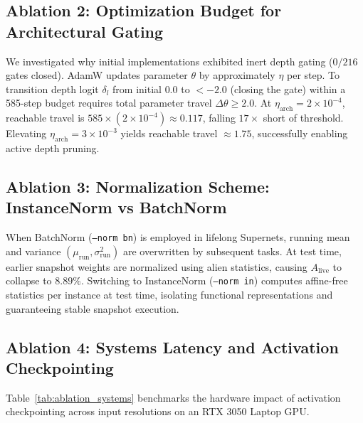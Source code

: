 \documentclass[11pt, a4paper]{article}
\begin{document}
\subsection{Ablation 2: Optimization Budget for Architectural Gating}

We investigated why initial implementations exhibited inert depth gating ($0/216$ gates closed). AdamW updates parameter $\theta$ by approximately $\eta$ per step. To transition depth logit $\delta_l$ from initial $0.0$ to $< -2.0$ (closing the gate) within a 585-step budget requires total parameter travel $\Delta \theta \ge 2.0$. At $\eta_{\text{arch}} = 2 \times 10^{-4}$, reachable travel is $585 \times (2 \times 10^{-4}) \approx 0.117$, falling $17\times$ short of threshold. Elevating $\eta_{\text{arch}} = 3 \times 10^{-3}$ yields reachable travel $\approx 1.75$, successfully enabling active depth pruning.

\subsection{Ablation 3: Normalization Scheme: InstanceNorm vs BatchNorm}

When BatchNorm (\texttt{--norm bn}) is employed in lifelong Supernets, running mean and variance $(\mu_{\text{run}}, \sigma^2_{\text{run}})$ are overwritten by subsequent tasks. At test time, earlier snapshot weights are normalized using alien statistics, causing $A_{\text{live}}$ to collapse to $8.89\%$. Switching to InstanceNorm (\texttt{--norm in}) computes affine-free statistics per instance at test time, isolating functional representations and guaranteeing stable snapshot execution.

\subsection{Ablation 4: Systems Latency and Activation Checkpointing}

Table~\ref{tab:ablation_systems} benchmarks the hardware impact of activation checkpointing across input resolutions on an RTX 3050 Laptop GPU.
\end{document}
